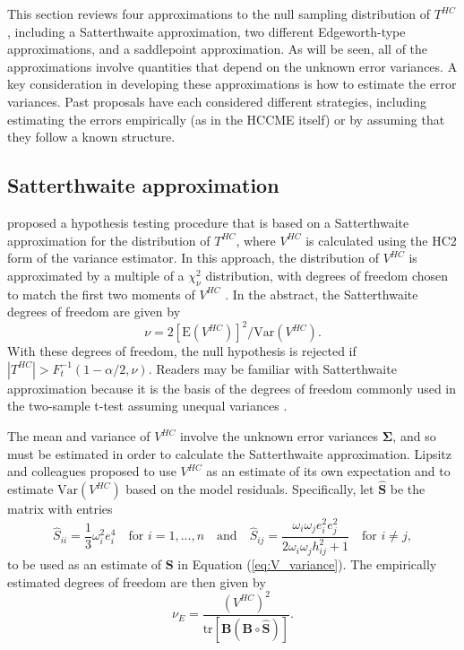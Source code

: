 \documentclass[12pt]{article}\usepackage[]{graphicx}\usepackage[]{color}
\newcommand{\E}{\text{E}}
\newcommand{\Var}{\text{Var}}
\newcommand{\tr}{\text{tr}}
\newcommand{\bm}{\mathbf}
\newcommand{\bs}{\boldsymbol}
\begin{document}
This section reviews four approximations to the null sampling distribution of $T^{HC}$, including a Satterthwaite approximation, two different Edgeworth-type approximations, and a saddlepoint approximation. 
As will be seen, all of the approximations involve quantities that depend on the unknown error variances. 
A key consideration in developing these approximations is how to estimate the error variances. 
Past proposals have each considered different strategies, including estimating the errors empirically (as in the HCCME itself) or by assuming that they follow a known structure. 

\subsection{Satterthwaite approximation} 

\citet{Lipsitz1999degrees} proposed a hypothesis testing procedure that is based on a Satterthwaite approximation for the distribution of $T^{HC}$, where $V^{HC}$ is calculated using the HC2 form of the variance estimator. 
In this approach, the distribution of $V^{HC}$ is approximated by a multiple of a $\chi^2_\nu$ distribution, with degrees of freedom chosen to match the first two moments of $V^{HC}$ \citep{Satterthwaite1946approximate}. 
In the abstract, the Satterthwaite degrees of freedom are given by 
\[
\nu = 2 \left[\E\left(V^{HC}\right)\right]^2 / \Var\left(V^{HC}\right).
\]
With these degrees of freedom, the null hypothesis is rejected if $|T^{HC}| > F_t^{-1}\left(1 - \alpha / 2, \nu\right)$. 
Readers may be familiar with Satterthwaite approximation because it is the basis of the degrees of freedom commonly used in the two-sample t-test assuming unequal variances \citep{Welch1947generalization}. 

The mean and variance of $V^{HC}$ involve the unknown error variances $\bs\Sigma$, and so  must be estimated in order to calculate the Satterthwaite approximation. 
Lipsitz and colleagues proposed to use $V^{HC}$ as an estimate of its own expectation and to estimate $\Var\left(V^{HC}\right)$ based on the model residuals. 
Specifically, let $\bm{\hat{S}}$ be the matrix with entries \[
\hat{S}_{ii} = \frac{1}{3}\omega_i^2 e_i^4 \quad \text{for } i = 1,...,n \quad \text{and} \quad \hat{S}_{ij} = \frac{\omega_i \omega_j e_i^2 e_j^2}{2\omega_i \omega_j h_{ij}^2 + 1} \quad \text{for } i \neq j, \]
to be used as an estimate of $\bm{S}$ in Equation (\ref{eq:V_variance}).
The empirically estimated degrees of freedom are then given by
\begin{equation}
\label{eq:nu_empirical}
\nu_E = \frac{\left(V^{HC}\right)^2}{\tr\left[\bm{B} \left(\bm{B} \circ \bm{\hat{S}}\right)\right]}.
\end{equation}
\end{document}
